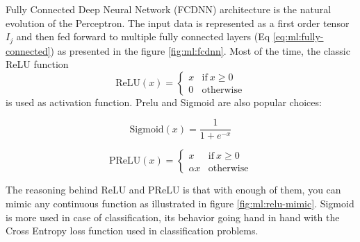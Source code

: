 \documentclass[../main.tex]{subfiles}
\begin{document}
Fully Connected Deep Neural Network (FCDNN) architecture is the natural evolution of the Perceptron. The input data is represented as a first order tensor $I_j$ and then fed forward to multiple fully connected layers (Eq \ref{eq:ml:fully-connected}) as presented in the figure \ref{fig:ml:fcdnn}. Most of the time, the classic ReLU function
\begin{equation}
  \label{sec:ml:relu}
  \mathrm{ReLU}(x) = \begin{cases}
    x & \mathrm{if} ~ x \geq 0 \\
    0 & \mathrm{otherwise}
  \end{cases}
\end{equation}
is used as activation function. Prelu and Sigmoid are also popular choices:


\begin{minipage}{0.5\linewidth}
  \begin{equation}
    \label{sec:ml:sigmoid}
    \mathrm{Sigmoid}(x) = \frac{1}{1+ e^{-x}}
  \end{equation}
\end{minipage}
\begin{minipage}{0.5\linewidth}
  \begin{equation}
    \label{sec:ml:prelu}
    \mathrm{PReLU}(x) = \begin{cases}
      x & \mathrm{if} ~ x \geq 0 \\
      \alpha x & \mathrm{otherwise}
    \end{cases}
  \end{equation}
\end{minipage}


The reasoning behind ReLU and PReLU is that with enough of them, you can mimic any continuous function as illustrated in figure \ref{fig:ml:relu-mimic}. Sigmoid is more used in case of classification, its behavior going hand in hand with the Cross Entropy loss function used in classification problems.
\end{document}
